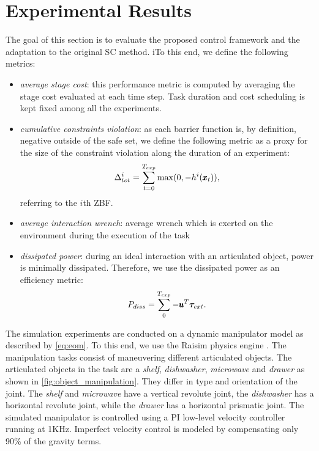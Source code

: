 \section{Experimental Results} \label{sec:experiments}

The goal of this section is to evaluate the proposed control framework and the adaptation to the original SC method. iTo this end, we define the following metrics:
\begin{itemize}
    \item \textit{average stage cost}: this performance metric is computed by averaging the stage cost evaluated at each time step. Task duration and cost scheduling is kept fixed among all the experiments.  
    \item \textit{cumulative constraints violation}: as each barrier function is, by definition, negative outside of the safe set, we define the following metric as a proxy for the size of the constraint violation along the duration of an experiment:
    \begin{equation*}
        \Delta^{i}_{tot} = \sum\limits_{t=0}^{T_{exp}} \max(0, -h^i(\pmb{x}_t)),
    \end{equation*}
    referring to the $i$th ZBF.
    \item \textit{average interaction wrench}: average wrench which is exerted on the environment during the execution of the task
    \item \textit{dissipated power}: during an ideal interaction with an articulated object, power is minimally dissipated. Therefore, we use the dissipated power as an efficiency metric:
    \begin{equation}
        P_{diss} = \sum\limits_{0}^{T_{exp}} -\pmb{u}^T \boldsymbol{\tau}_{ext}.
    \end{equation}
\end{itemize}
The simulation experiments are conducted on a dynamic manipulator model as described by \eqn \eqref{eq:eom}. To this end, we use the Raisim physics engine \cite{raisim}. The manipulation tasks consist of maneuvering different articulated objects. The articulated objects in the task are a \textit{shelf}, \textit{dishwasher}, \textit{microwave} and \textit{drawer} as shown in \fig\ref{fig:object_manipulation}. They differ in type and orientation of the joint. The \textit{shelf} and \textit{microwave} have a vertical revolute joint, the \textit{dishwasher} has a horizontal revolute joint, while the \textit{drawer} has a horizontal prismatic joint. The simulated manipulator is controlled using a PI low-level velocity controller running at 1KHz. Imperfect velocity control is modeled by compensating only 90\% of the gravity terms.
  
